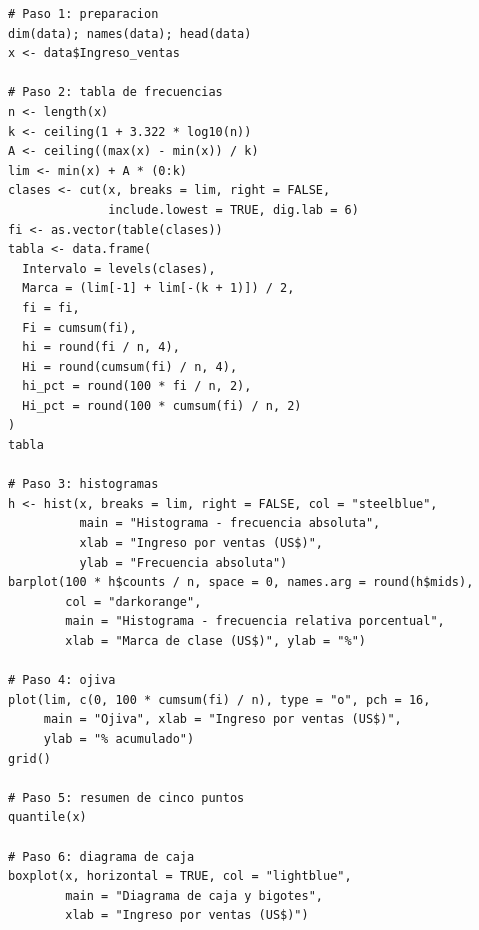 \documentclass[12pt,letterpaper]{article}
\begin{document}
\begin{lstlisting}
# Paso 1: preparacion
dim(data); names(data); head(data)
x <- data$Ingreso_ventas

# Paso 2: tabla de frecuencias
n <- length(x)
k <- ceiling(1 + 3.322 * log10(n))
A <- ceiling((max(x) - min(x)) / k)
lim <- min(x) + A * (0:k)
clases <- cut(x, breaks = lim, right = FALSE,
              include.lowest = TRUE, dig.lab = 6)
fi <- as.vector(table(clases))
tabla <- data.frame(
  Intervalo = levels(clases),
  Marca = (lim[-1] + lim[-(k + 1)]) / 2,
  fi = fi,
  Fi = cumsum(fi),
  hi = round(fi / n, 4),
  Hi = round(cumsum(fi) / n, 4),
  hi_pct = round(100 * fi / n, 2),
  Hi_pct = round(100 * cumsum(fi) / n, 2)
)
tabla

# Paso 3: histogramas
h <- hist(x, breaks = lim, right = FALSE, col = "steelblue",
          main = "Histograma - frecuencia absoluta",
          xlab = "Ingreso por ventas (US$)",
          ylab = "Frecuencia absoluta")
barplot(100 * h$counts / n, space = 0, names.arg = round(h$mids),
        col = "darkorange",
        main = "Histograma - frecuencia relativa porcentual",
        xlab = "Marca de clase (US$)", ylab = "%")

# Paso 4: ojiva
plot(lim, c(0, 100 * cumsum(fi) / n), type = "o", pch = 16,
     main = "Ojiva", xlab = "Ingreso por ventas (US$)",
     ylab = "% acumulado")
grid()

# Paso 5: resumen de cinco puntos
quantile(x)

# Paso 6: diagrama de caja
boxplot(x, horizontal = TRUE, col = "lightblue",
        main = "Diagrama de caja y bigotes",
        xlab = "Ingreso por ventas (US$)")
\end{lstlisting}
\end{document}
